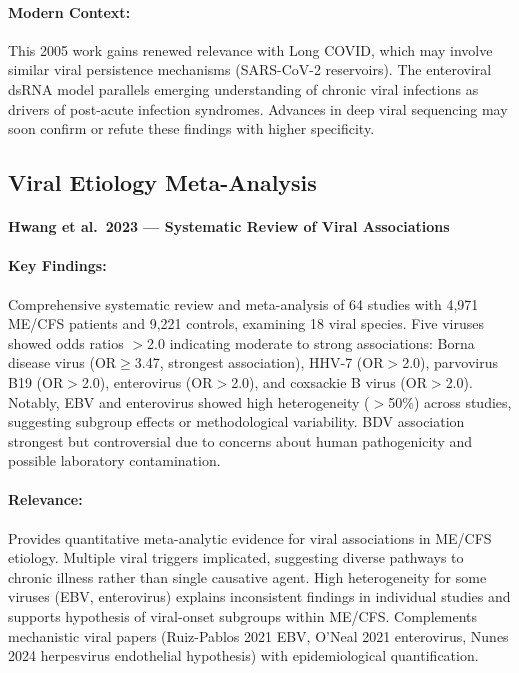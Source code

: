 \paragraph{Modern Context:}
This 2005 work gains renewed relevance with Long COVID, which may involve similar viral persistence mechanisms (SARS-CoV-2 reservoirs). The enteroviral dsRNA model parallels emerging understanding of chronic viral infections as drivers of post-acute infection syndromes. Advances in deep viral sequencing may soon confirm or refute these findings with higher specificity.

\subsection{Viral Etiology Meta-Analysis}

\paragraph{Hwang et al.\ 2023 --- Systematic Review of Viral Associations}

\cite{hwang2023viral}

\paragraph{Key Findings:}
Comprehensive systematic review and meta-analysis of 64 studies with 4,971 ME/CFS patients and 9,221 controls, examining 18 viral species. Five viruses showed odds ratios $>$2.0 indicating moderate to strong associations: Borna disease virus (OR$\geq$3.47, strongest association), HHV-7 (OR$>$2.0), parvovirus B19 (OR$>$2.0), enterovirus (OR$>$2.0), and coxsackie B virus (OR$>$2.0). Notably, EBV and enterovirus showed high heterogeneity ($>$50\%) across studies, suggesting subgroup effects or methodological variability. BDV association strongest but controversial due to concerns about human pathogenicity and possible laboratory contamination.

\paragraph{Relevance:}
Provides quantitative meta-analytic evidence for viral associations in ME/CFS etiology. Multiple viral triggers implicated, suggesting diverse pathways to chronic illness rather than single causative agent. High heterogeneity for some viruses (EBV, enterovirus) explains inconsistent findings in individual studies and supports hypothesis of viral-onset subgroups within ME/CFS. Complements mechanistic viral papers (Ruiz-Pablos 2021 EBV, O'Neal 2021 enterovirus, Nunes 2024 herpesvirus endothelial hypothesis) with epidemiological quantification.

